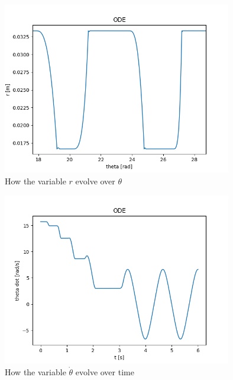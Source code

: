 \begin{figure}[ht]
	\centering
	\includegraphics[width=10cm]{img/simulation/r_theta_t_zoom.png}
	\caption{How the variable $r$ evolve over $\theta$}
	\label{fig:r theta zoom}
\end{figure}

\begin{figure}[ht]
	\centering
	\includegraphics[width=10cm]{img/simulation/d_theta_t.png}
	\caption{How the variable $\dot{\theta}$ evolve over time}
	\label{fig:d theta t diagram}
\end{figure}